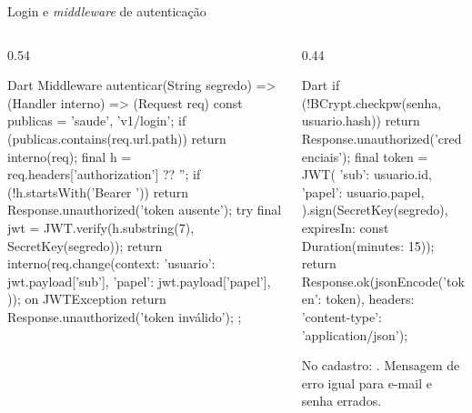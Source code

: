 \documentclass[aspectratio=169,10pt]{beamer}
\begin{document}
\begin{frame}[fragile]{Login e \emph{middleware} de autenticação}
  \begin{columns}[T]
    \begin{column}{0.54\textwidth}
\begin{codigo}[title=lib/auth.dart]{Dart}
Middleware autenticar(String segredo) =>
    (Handler interno) => (Request req) {
  const publicas = {'saude', 'v1/login'};
  if (publicas.contains(req.url.path)) return interno(req);
  final h = req.headers['authorization'] ?? '';
  if (!h.startsWith('Bearer ')) {
    return Response.unauthorized('token ausente');
  }
  try {
    final jwt = JWT.verify(h.substring(7), SecretKey(segredo));
    return interno(req.change(context: {
      'usuario': jwt.payload['sub'],
      'papel': jwt.payload['papel'],
    }));
  } on JWTException {
    return Response.unauthorized('token inválido');
  }
};
\end{codigo}
    \end{column}
    \begin{column}{0.44\textwidth}
\begin{codigo}[title={No login, após conferir a senha}]{Dart}
if (!BCrypt.checkpw(senha, usuario.hash)) {
  return Response.unauthorized('credenciais');
}
final token = JWT(
  {'sub': usuario.id, 'papel': usuario.papel},
).sign(SecretKey(segredo),
    expiresIn: const Duration(minutes: 15));
return Response.ok(jsonEncode({'token': token}),
    headers: {'content-type': 'application/json'});
\end{codigo}
      \begin{dica}
        No cadastro: . Mensagem de erro igual para e-mail e senha errados.
      \end{dica}
    \end{column}
  \end{columns}
\end{frame}
\end{document}
